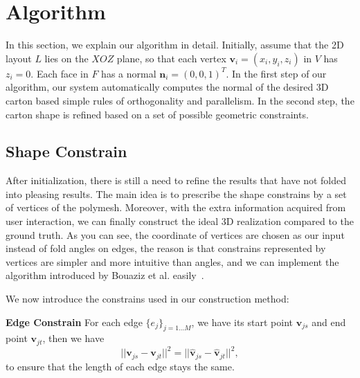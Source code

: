 \section{Algorithm}\label{sec:optimization}


In this section, we explain our algorithm in detail. 
Initially, assume that the 2D layout $L$ lies on the $XOZ$ plane, so that each vertex $\mathbf{v}_i=(x_i,y_i,z_i)$ in $V$ has $z_i=0$. 
Each face in $F$ has a normal $\mathbf{n}_i=(0,0,1)^T$.
%
In the first step of our algorithm, our system automatically computes the normal of the desired 3D carton based simple rules of orthogonality and parallelism.
In the second step, the carton shape is refined based on a set of possible geometric constraints.



\subsection{Shape Constrain}
After initialization, there is still a need to refine the results that have not folded into pleasing results. The main idea is to prescribe the shape constrains by a set of vertices of the polymesh. Moreover, with the extra information acquired from user interaction, we can finally construct the ideal 3D realization compared to the ground truth. As you can see, the coordinate of vertices are chosen as our input instead of fold angles on edges, the reason is that constrains represented by vertices are simpler and more intuitive than angles, and we can implement the algorithm introduced by Bouaziz et al. easily~\cite{Bouaziz:2012:SSD:2346796.2346802}.

We now introduce the constrains used in our construction method:

\noindent
\textbf{Edge Constrain} For each edge $\{e_j\}_{j=1...M}$, we have its start point $\mathbf{v}_{js}$ and end point $\mathbf{v}_{jt}$, then we have 
\begin{equation}
||\mathbf{v}_{js} - \mathbf{v}_{jt}||^2 = ||\mathbf{\hat{v}}_{js} - \mathbf{\hat{v}}_{jt}||^2,
\label{equ:edge}
\end{equation}
to ensure that the length of each edge stays the same.

